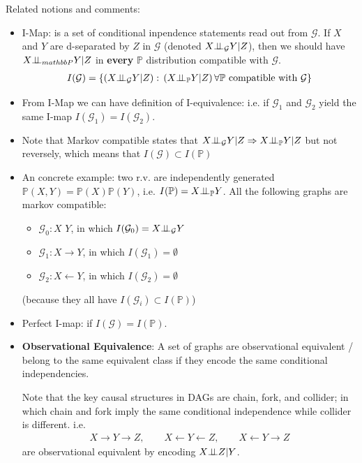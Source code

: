 Related notions and comments:

\begin{itemize}[topsep=2pt,itemsep=0pt]
    \item I-Map: is a set of conditional inpendence statements read out from $ \mathcal{G} $. If $ X $ and $ Y $ are d-separated by $ Z $ in $ \mathcal{G} $ (denoted $ X\bot\!\!\!\bot_\mathcal{G} Y|Z $), then we should have $ X\bot\!\!\!\bot_{mathbb{P}} Y |Z$ in \textbf{every} $ \mathbb{P} $ distribution compatible with $ \mathcal{G} $.
    \begin{align}
         I(\mathcal{G})=\left\{ (X\bot\!\!\!\bot_\mathcal{G}Y|Z):\, (X\bot\!\!\!\bot_\mathbb{P}Y|Z) \,\forall \mathbb{P}\text{ compatible with }\mathcal{G}  \right\}
    \end{align}
    \item From I-Map we can have definition of I-equivalence: i.e. if $ \mathcal{G}_1 $ and $ \mathcal{G}_2 $ yield the same I-map $ I(\mathcal{G}_1)=I(\mathcal{G}_2) $.
    \item Note that Markov compatible states that $ X\bot\!\!\!\bot _\mathcal{G} Y|Z\Rightarrow  X\bot\!\!\!\bot _\mathbb{P} Y|Z $ but not reversely, which means that $ I(\mathcal{G})\subset I(\mathbb{P}) $
    \item An concrete example: two r.v. are independently generated $ \mathbb{P}\left( X,Y \right) =\mathbb{P}\left( X\right)\mathbb{P}\left( Y \right) $, i.e. $ I(\mathbb{P})= X\bot\!\!\!\bot_\mathbb{P} Y $. All the following graphs are markov compatible:
    \begin{itemize}[topsep=2pt,itemsep=0pt]
        \item $ \mathcal{G}_0: X\,\, Y $, in which $ I(\mathcal{G}_0) = X\bot\!\!\!\bot _\mathcal{G} Y $
        \item $ \mathcal{G}_1: X\to Y $, in which $ I(\mathcal{G}_1) = \emptyset  $
        \item $ \mathcal{G}_2: X\leftarrow Y $, in which $  I(\mathcal{G}_2) = \emptyset $
    \end{itemize}
    (because they all have $ I(\mathcal{G}_i)\subset I(\mathbb{P}) $)
    \item Perfect I-map: if $ I(\mathcal{G})=I(\mathbb{P}) $.
    \item \textbf{Observational Equivalence}: A set of graphs are observational equivalent / belong to the same equivalent class if they encode the same conditional independencies. 
    
    Note that the key causal structures in DAGs are chain, fork, and collider; in which chain and fork imply the same conditional independence while collider is different. i.e.
    \begin{align}
        X\to Y\to Z,\qquad X\leftarrow Y\leftarrow Z,\qquad X\leftarrow Y \to Z 
    \end{align}
    are observational equivalent by encoding $ X\bot\!\!\!\bot Z|Y $.
    

\end{itemize}
